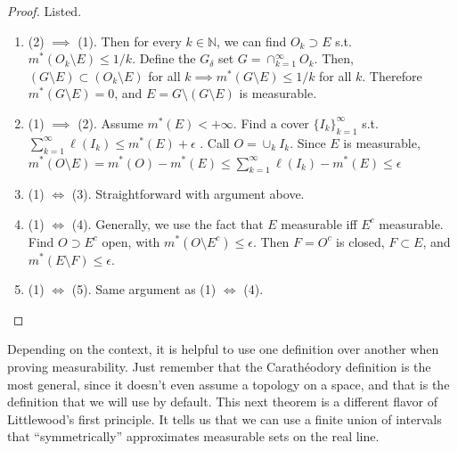   \begin{proof}
    Listed. 
    \begin{enumerate}
      \item (2) $\implies$ (1). Then for every $k \in \mathbb{N}$, we can find $O_k \supset E$ s.t. $m^\ast (O_k \setminus E) \leq 1/k$. Define the $G_\delta$ set $G = \cap_{k=1}^\infty O_k$. Then, $(G \setminus E) \subset (O_k \setminus E)$ for all $k \implies m^\ast (G \setminus E) \leq 1/k$ for all $k$. Therefore $m^\ast (G \setminus E) = 0$, and $E = G \setminus (G \setminus E)$ is measurable. 

      \item (1) $\implies$ (2). Assume $m^\ast (E) < +\infty$. Find a cover $\{I_k \}_{k=1}^\infty$ s.t. $\sum_{k=1}^\infty \ell (I_k) \leq m^\ast (E) + \epsilon$ . Call $O = \cup_k I_k$. Since $E$ is measurable, $m^\ast (O \setminus E) = m^\ast (O) - m^\ast (E) \leq \sum_{k=1}^\infty \ell(I_k) - m^\ast (E) \leq \epsilon$ 

      \item (1) $\iff$ (3). Straightforward with argument above.  

      \item (1) $\iff$ (4). Generally, we use the fact that $E$ measurable iff $E^c$ measurable. Find $O \supset E^c$ open, with $m^\ast (O \setminus E^c) \leq \epsilon$. Then $F = O^c$ is closed, $F \subset E$, and $m^\ast (E \setminus F) \leq \epsilon$. 

      \item (1) $\iff$ (5). Same argument as (1) $\iff$ (4). 
    \end{enumerate}
  \end{proof}

  Depending on the context, it is helpful to use one definition over another when proving measurability. Just remember that the Carathéodory definition is the most general, since it doesn't even assume a topology on a space, and that is the definition that we will use by default. This next theorem is a different flavor of Littlewood's first principle. It tells us that we can use a finite union of intervals that ``symmetrically'' approximates measurable sets on the real line. 

